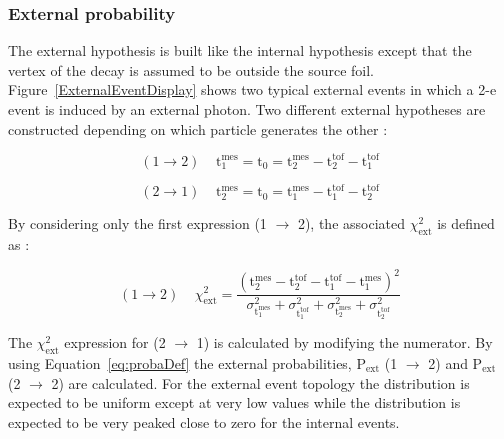 \documentclass[main.tex]{subfiles}
\begin{document}
\FloatBarrier


\subsubsection{External probability}\label{sec:Pext}


\NI The external hypothesis is built like the internal hypothesis except that the vertex of the decay is assumed to be outside the source foil. Figure~\ref{ExternalEventDisplay} shows two typical external events in which a 2-e event is induced by an external photon. Two different external hypotheses are constructed depending on which particle generates the other :


\begin{equation}
(\text{1} \rightarrow \text{2})~~~~~ \text{t}_\text{1}^{\text{mes}} = \text{t}_\text{0} = \text{t}_\text{2}^{\text{mes}} - \text{t}_\text{2}^{\text{tof}} - \text{t}_\text{1}^{\text{tof}}
\end{equation}

\begin{equation}
(\text{2} \rightarrow \text{1})~~~~~ \text{t}_\text{2}^{\text{mes}} = \text{t}_\text{0} = \text{t}_\text{1}^{\text{mes}} - \text{t}_\text{1}^{\text{tof}} - \text{t}_\text{2}^{\text{tof}}
\end{equation}


\NI By considering only the first expression (1 $\rightarrow$ 2), the associated $\chi^\text{2}_{\text{ext}}$ is defined as : 

\begin{equation}
(\text{1} \rightarrow \text{2})~~~~~ \chi^\text{2}_{\text{ext}} = \frac{ (\text{t}_\text{2}^{\text{mes}} - \text{t}_\text{2}^{\text{tof}} - \text{t}_\text{1}^{\text{tof}} - \text{t}_\text{1}^{\text{mes}} )^\text{2} }{  \sigma^{\text{2}}_{\text{t}_\text{1}^{\text{mes}}} + \sigma^{\text{2}}_{\text{t}_\text{1}^{\text{tof}}} + \sigma^{\text{2}}_{\text{t}_\text{2}^{\text{mes}}} + \sigma^{\text{2}}_{\text{t}_\text{2}^{\text{tof}}} }
\end{equation}


\NI The $\chi^\text{2}_{\text{ext}}$ expression for (2 $\rightarrow$ 1) is calculated by modifying the numerator. By using Equation~\ref{eq:probaDef} the external probabilities, P$_{\text{ext}}$ (1 $\rightarrow$ 2) and P$_{\text{ext}}$ (2 $\rightarrow$ 2) are calculated. For the external event topology the distribution is expected to be uniform except at very low values while the distribution is expected to be very peaked close to zero for the internal events.
\end{document}
